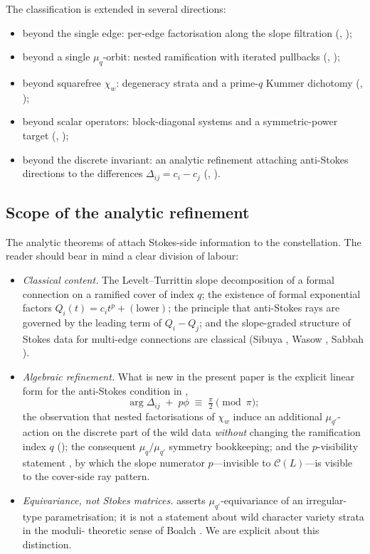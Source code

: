 \documentclass[aip,jmp,preprint,amsmath,amssymb,nofootinbib,floatfix]{revtex4-2}
\theoremstyle{plain}
\theoremstyle{definition}
\theoremstyle{remark}
\newcommand{\Cl}{\mathcal{C}}
\newcommand{\Dij}{\Delta_{ij}}
\begin{document}
The classification is extended in several directions:
\begin{itemize}[leftmargin=*]
\item beyond the single edge: per-edge factorisation along the slope
      filtration (, );
\item beyond a single $\mu_q$-orbit: nested ramification with iterated
      pullbacks (, );
\item beyond squarefree $\chi_w$: degeneracy strata and a prime-$q$
      Kummer dichotomy (, );
\item beyond scalar operators: block-diagonal systems and a
      symmetric-power target (, );
\item beyond the discrete invariant: an analytic refinement attaching
      anti-Stokes directions to the differences $\Dij = c_i - c_j$
      (, ).
\end{itemize}

\subsection{Scope of the analytic refinement}
\label{ssec:intro-analytic-scope}

The analytic theorems of  attach Stokes-side
information to the constellation. The reader should bear in mind a
clear division of labour:
\begin{itemize}[leftmargin=2em]
\item \emph{Classical content.} The Levelt--Turrittin slope
decomposition of a formal connection on a ramified cover of index $q$;
the existence of formal exponential factors $Q_i(t) = c_i t^p +
(\text{lower})$; the principle that anti-Stokes rays are governed by
the leading term of $Q_i - Q_j$; and the slope-graded structure of
Stokes data for multi-edge connections are classical
(Sibuya \cite{sibuya}, Wasow \cite{wasow}, Sabbah
\cite{sabbah-polarizable}).
\item \emph{Algebraic refinement.} What is new in the present paper
is the explicit linear form for the anti-Stokes condition in
,
\[
   \arg \Dij \;+\; p\phi \;\equiv\; \tfrac{\pi}{2} \pmod \pi;
\]
the observation that nested factorisations of $\chi_w$ induce an
additional $\mu_{q'}$-action on the discrete part of the wild data
\emph{without} changing the ramification index $q$ ();
the consequent $\mu_q/\mu_{q'}$ symmetry bookkeeping; and the
$p$-visibility statement , by which the slope numerator
$p$---invisible to $\Cl(L)$---is visible to the cover-side ray pattern.
\item \emph{Equivariance, not Stokes matrices.}  asserts
$\mu_{q'}$-equivariance of an irregular-type parametrisation; it is
not a statement about wild character variety strata in the moduli-
theoretic sense of Boalch \cite{boalch-stokes,boalch-wildhodge}.
We are explicit about this distinction.
\end{itemize}
\end{document}
